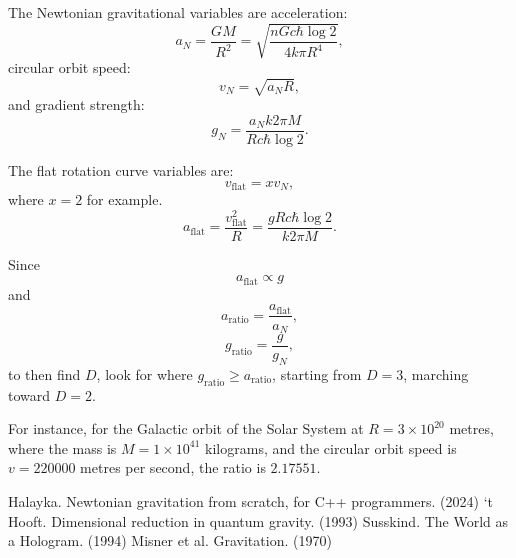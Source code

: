 \documentclass[12pt]{article}
\begin{document}
The Newtonian gravitational variables are acceleration:
\begin{equation}
a_N = \frac{G M}{R^2} = \sqrt{\frac{n G c \hbar \log 2}{4 k \pi R^4}},
\end{equation}
circular orbit speed:
\begin{equation}
v_N = \sqrt{a_N R},
\end{equation}
and gradient strength:
\begin{equation}
g_N = \frac{a_N k 2 \pi M}{R c \hbar \log 2}. 
\end{equation}

The flat rotation curve variables are:
\begin{equation}
v_{\textrm{flat}} = x v_N,
\end{equation}
where $x = 2$ for example.
\begin{equation}
a_{\textrm{flat}} = \frac{v_{\textrm{flat}}^2}{R} = \frac{g R c \hbar \log 2}{k 2 \pi M}.
\end{equation}

Since
\begin{equation}
a_{\textrm{flat}} \propto g
\end{equation}
and
\begin{equation}
a_{\textrm{ratio}} = \frac{a_{\textrm{flat}}}{a_N},
\end{equation}
\begin{equation}
g_{\textrm{ratio}} = \frac{g}{g_N},
\end{equation}
to then find $D$, look for where $g_{\textrm{ratio}} \geq a_{\textrm{ratio}}$, starting from $D = 3$, marching toward $D = 2$.

For instance, for the Galactic orbit of the Solar System at $R = 3 \times 10^{20}$ metres, where the mass is $M = 1 \times 10^{41}$ kilograms, and the circular orbit speed is $v = 220000$ metres per second, the ratio is $2.17551$.




\begin{thebibliography}{9}

 Halayka. Newtonian gravitation from scratch, for C++ programmers. (2024)
 `t Hooft. Dimensional reduction in quantum gravity. (1993)
 Susskind. The World as a Hologram. (1994)
 Misner et al. Gravitation. (1970)

\end{thebibliography}



\pagebreak
\end{document}
